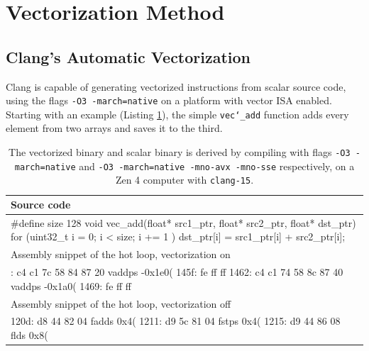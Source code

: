 \documentclass[logo,bsc,singlespacing,parskip]{infthesis}
\newenvironment{VerbatimCompact}
  {\vspace*{-2.5mm}\VerbatimEnvironment
   \par\Verbatim}
  {\endVerbatim\vspace*{-2.4mm}}
\begin{document}
\section{Vectorization Method}
\label{sec:vectorization-method}
\subsection{Clang's Automatic Vectorization}
Clang is capable of generating vectorized instructions from scalar source code,
using the flags \texttt{-O3 -march=native} on a platform with vector ISA
enabled. Starting with an example (Listing \ref{vec-add-float-auto}), the simple
\texttt{vec\char`_add} function adds every element from two arrays and saves it to
the third. 

\begin{table}[ht]\captionsetup{name=Listing}
\begin{tabular}{>{\raggedright\arraybackslash}p{14cm}}
    Source code\\
    \midrule
    \begin{VerbatimCompact}
#define size 128
void vec_add(float* src1_ptr, float* src2_ptr, float* dst_ptr) {
    for (uint32_t i = 0; i < size; i += 1 ){
        dst_ptr[i] = src1_ptr[i] + src2_ptr[i];
    }
}
    \end{VerbatimCompact}
    \\

    Assembly snippet of the hot loop, vectorization on\\
    \midrule
    \begin{VerbatimCompact}
1458: c4 c1 7c 58 84 87 20 vaddps -0x1e0(%
145f: fe ff ff
1462: c4 c1 74 58 8c 87 40 vaddps -0x1a0(%
1469: fe ff ff
    \end{VerbatimCompact}
    \\
    Assembly snippet of the hot loop, vectorization off\\
    \midrule
    \begin{VerbatimCompact}
120d: d8 44 82 04    fadds  0x4(%
1211: d9 5c 81 04    fstps  0x4(%
1215: d9 44 86 08    flds   0x8(%
    \end{VerbatimCompact}
\end{tabular}
\caption{The vectorized binary and scalar binary is derived by compiling with flags
\texttt{-O3 -march=native} and \texttt{-O3 -march=native -mno-avx -mno-sse}
respectively, on a Zen 4 computer with \texttt{clang-15}.}
\label{vec-add-float-auto}
\end{table}
\end{document}
